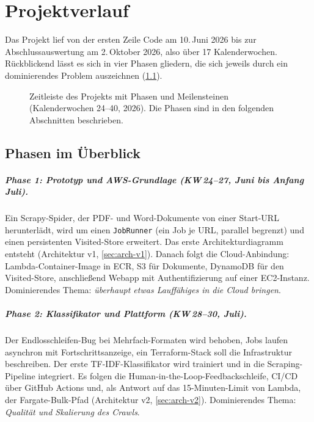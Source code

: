 \chapter{Projektverlauf}\label{ch:verlauf}

Das Projekt lief von der ersten Zeile Code am 10.\,Juni 2026 bis zur Abschlussauswertung am 2.\,Oktober 2026, also über 17 Kalenderwochen. Rückblickend lässt es sich in vier Phasen gliedern, die sich jeweils durch ein dominierendes Problem auszeichnen (\cref{fig:zeitleiste}).

\begin{figure}[htbp]\centering
  \resizebox{\linewidth}{!}{\zeitleiste}
  \caption{Zeitleiste des Projekts mit Phasen und Meilensteinen (Kalenderwochen 24--40, 2026). Die Phasen sind in den folgenden Abschnitten beschrieben.}\label{fig:zeitleiste}
\end{figure}

\section{Phasen im Überblick}

\paragraph{Phase 1: Prototyp und AWS-Grundlage (KW\,24--27, Juni bis Anfang Juli).}
Ein Scrapy-Spider, der PDF- und Word-Dokumente von einer Start-URL herunterlädt, wird um einen \texttt{JobRunner} (ein Job je URL, parallel begrenzt) und einen persistenten Visited-Store erweitert. Das erste Architekturdiagramm entsteht (Architektur v1, \cref{sec:arch-v1}). Danach folgt die Cloud-Anbindung: Lambda-Container-Image in ECR, S3 für Dokumente, DynamoDB für den Visited-Store, anschließend Webapp mit Authentifizierung auf einer EC2-Instanz. Dominierendes Thema: \emph{überhaupt etwas Lauffähiges in die Cloud bringen}.

\paragraph{Phase 2: Klassifikator und Plattform (KW\,28--30, Juli).}
Der Endlosschleifen-Bug bei Mehrfach-Formaten wird behoben, Jobs laufen asynchron mit Fortschrittsanzeige, ein Terraform-Stack soll die Infrastruktur beschreiben. Der erste TF-IDF-Klassifikator wird trainiert und in die Scraping-Pipeline integriert. Es folgen die Human-in-the-Loop-Feedbackschleife, CI/CD über GitHub Actions und, als Antwort auf das 15-Minuten-Limit von Lambda, der Fargate-Bulk-Pfad (Architektur v2, \cref{sec:arch-v2}). Dominierendes Thema: \emph{Qualität und Skalierung des Crawls}.

